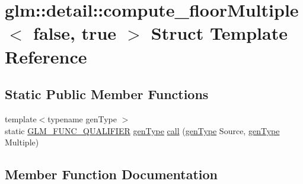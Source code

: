 \hypertarget{structglm_1_1detail_1_1compute__floor_multiple_3_01false_00_01true_01_4}{}\section{glm\+:\+:detail\+:\+:compute\+\_\+floor\+Multiple$<$ false, true $>$ Struct Template Reference}
\label{structglm_1_1detail_1_1compute__floor_multiple_3_01false_00_01true_01_4}
\subsection*{Static Public Member Functions}
\begin{DoxyCompactItemize}
\item 
{\footnotesize template$<$typename gen\+Type $>$ }\\static \hyperlink{setup_8hpp_a33fdea6f91c5f834105f7415e2a64407}{G\+L\+M\+\_\+\+F\+U\+N\+C\+\_\+\+Q\+U\+A\+L\+I\+F\+I\+ER} \hyperlink{structglm_1_1detail_1_1gen_type}{gen\+Type} \hyperlink{structglm_1_1detail_1_1compute__floor_multiple_3_01false_00_01true_01_4_a1d2dfa9746c67e805de83b41b6a7a94d}{call} (\hyperlink{structglm_1_1detail_1_1gen_type}{gen\+Type} Source, \hyperlink{structglm_1_1detail_1_1gen_type}{gen\+Type} Multiple)
\end{DoxyCompactItemize}


\subsection{Member Function Documentation}
\mbox{\label{structglm_1_1detail_1_1compute__floor_multiple_3_01false_00_01true_01_4_a1d2dfa9746c67e805de83b41b6a7a94d}} 
